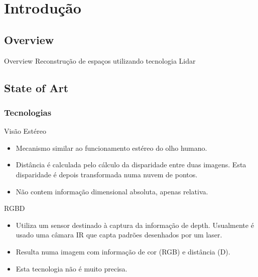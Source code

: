 \section{Introdução}

\subsection{Overview}

\begin{frame}{Overview}
	Reconstrução de espaços utilizando tecnologia Lidar			
\end{frame}



\subsection{State of Art}

\subsubsection{Tecnologias}

\begin{frame}{Visão Estéreo}
			
	\begin{itemize}
		\item Mecanismo similar ao funcionamento estéreo do olho humano.
		\item Distância é calculada pelo cálculo da disparidade entre duas imagens. Esta disparidade é depois transformada numa nuvem de pontos.
		\item Não contem informação dimensional absoluta, apenas relativa.
	\end{itemize}
	
\end{frame}

\begin{frame}{RGBD}
	
	\begin{itemize}
		\item Utiliza um sensor destinado à captura da informação de depth. Usualmente é usado uma câmara IR que capta padrões desenhados por um laser.
		\item Resulta numa imagem com informação de cor (RGB) e distância (D).
		\item Esta tecnologia não é muito precisa.
	\end{itemize}
	
\end{frame}

